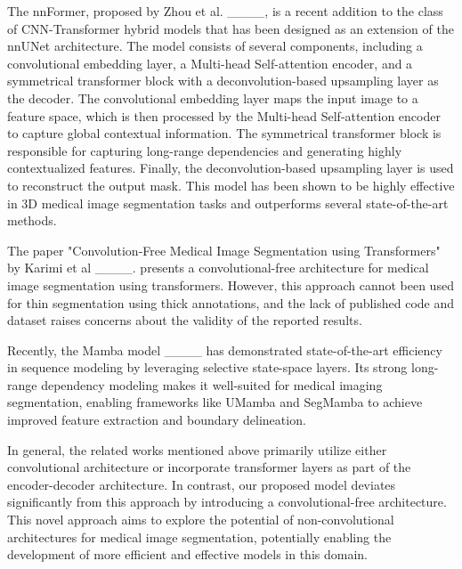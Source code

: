 The nnFormer, proposed by Zhou et al. ____, is a recent addition to the class of CNN-Transformer hybrid models that has been designed as an extension of the nnUNet architecture. The model consists of several components, including a convolutional embedding layer, a Multi-head Self-attention encoder, and a symmetrical transformer block with a deconvolution-based upsampling layer as the decoder. The convolutional embedding layer maps the input image to a feature space, which is then processed by the Multi-head Self-attention encoder to capture global contextual information. The symmetrical transformer block is responsible for capturing long-range dependencies and generating highly contextualized features. Finally, the deconvolution-based upsampling layer is used to reconstruct the output mask. This model has been shown to be highly effective in 3D medical image segmentation tasks and outperforms several state-of-the-art methods.

The paper "Convolution-Free Medical Image Segmentation using Transformers" by Karimi et al ____. presents a convolutional-free architecture for medical image segmentation using transformers. However, this approach cannot been used for thin segmentation using thick annotations, and the lack of published code and dataset raises concerns about the validity of the reported results.

Recently, the Mamba model ____ has demonstrated state-of-the-art efficiency in sequence modeling by leveraging selective state-space layers. Its strong long-range dependency modeling makes it well-suited for medical imaging segmentation, enabling frameworks like UMamba and SegMamba to achieve improved feature extraction and boundary delineation.

In general, the related works mentioned above primarily utilize either convolutional architecture or incorporate transformer layers as part of the encoder-decoder architecture. In contrast, our proposed model deviates significantly from this approach by introducing a convolutional-free architecture. This novel approach aims to explore the potential of non-convolutional architectures for medical image segmentation, potentially enabling the development of more efficient and effective models in this domain.